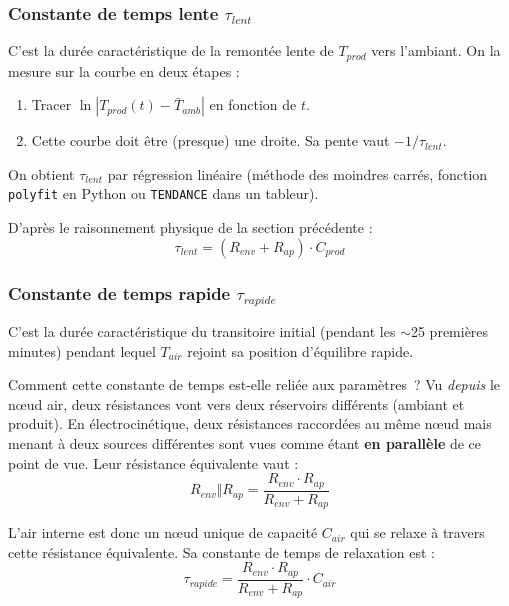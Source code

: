 \documentclass[11pt,a4paper]{article}
\begin{document}
\label{sec:phaseD_taus}
\subsubsection*{Constante de temps lente $\tau_{lent}$}

C'est la durée caractéristique de la remontée lente de $T_{prod}$ vers l'ambiant. On la
mesure sur la courbe en deux étapes :
\begin{enumerate}[itemsep=0pt]
\item Tracer $\ln|T_{prod}(t) - \bar T_{amb}|$ en fonction de $t$.
\item Cette courbe doit être (presque) une droite. Sa pente vaut $-1/\tau_{lent}$.
\end{enumerate}
On obtient $\tau_{lent}$ par régression linéaire (méthode des moindres carrés, fonction
\verb|polyfit| en Python ou \verb|TENDANCE| dans un tableur).

D'après le raisonnement physique de la section précédente :
\begin{equation}
\boxed{\;\tau_{lent} = (R_{env} + R_{ap}) \cdot C_{prod}\;}
\label{eq:taulent}
\end{equation}

\subsubsection*{Constante de temps rapide $\tau_{rapide}$}

C'est la durée caractéristique du transitoire initial (pendant les $\sim$25 premières
minutes) pendant lequel $T_{air}$ rejoint sa position d'équilibre rapide.

Comment cette constante de temps est-elle reliée aux paramètres~? Vu \emph{depuis} le nœud
air, deux résistances vont vers deux réservoirs différents (ambiant et produit). En
électrocinétique, deux résistances raccordées au même nœud mais menant à deux sources
différentes sont vues comme étant \textbf{en parallèle} de ce point de vue. Leur résistance
équivalente vaut :
$$R_{env}\Vert R_{ap} = \frac{R_{env} \cdot R_{ap}}{R_{env} + R_{ap}}$$

L'air interne est donc un nœud unique de capacité $C_{air}$ qui se relaxe à travers cette
résistance équivalente. Sa constante de temps de relaxation est :
\begin{equation}
\boxed{\;\tau_{rapide} = \frac{R_{env} \cdot R_{ap}}{R_{env} + R_{ap}} \cdot C_{air}\;}
\label{eq:taurapide}
\end{equation}
\end{document}
